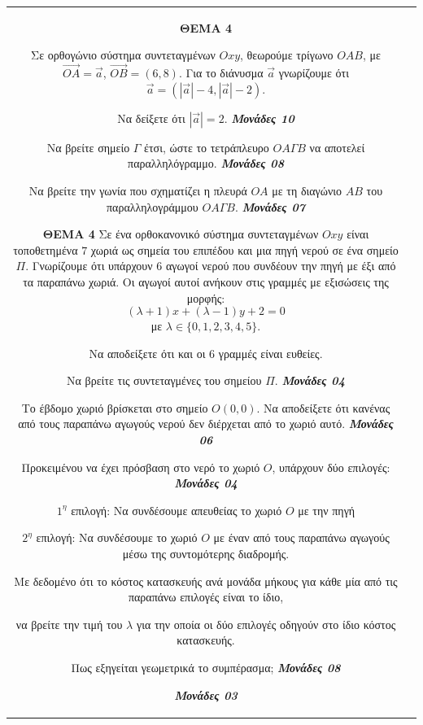 \documentclass[11pt,a4paper,twoside]{book}
\newcommand{\OnPar}[1]{{\notoserif\bfseries\fontsize{18}{22}\selectfont #1}}
\newcommand{\Askhseis}[1]{{\urwgothic\bfseries\fontsize{16}{19}\selectfont #1}}
\newcommand{\monades}[1]{
\hspace*{\fill}
\textbf{\textit{\textcolor{maincolor}{Μονάδες #1}}}}
\begin{document}
\begin{tabular}{cc}
\vspace{4mm}

\begin{center}
    \Askhseis{ΘΕΜΑ 4}
\end{center}

Σε ορθογώνιο σύστημα συντεταγμένων $Oxy$, θεωρούμε τρίγωνο $OAB$, με $\overrightarrow{OA} = \vec{a}$, $\overrightarrow{OB} = (6,8)$. Για το διάνυσμα $\vec{a}$ γνωρίζουμε
ότι $\vec{a} = (\left|\vec{a}\right| - 4, \left|\vec{a}\right| - 2)$.

\begin{alist}    \item Να δείξετε ότι $\left|\vec{a}\right| = 2$. \monades{10}
    \item Να βρείτε σημείο $\Gamma$ έτσι, ώστε το τετράπλευρο $OA\Gamma B$ να αποτελεί παραλληλόγραμμο. \monades{08}
    \item Να βρείτε την γωνία που σχηματίζει η πλευρά $OA$ με τη διαγώνιο $AB$ του παραλληλογράμμου $OA\Gamma B$. \monades{07}\end{alist}

\vspace{4mm}

\OnPar{ΘΕΜΑ 4}
Σε ένα ορθοκανονικό σύστημα συντεταγμένων $Oxy$ είναι τοποθετημένα $7$ χωριά ως σημεία του επιπέδου και μια πηγή νερού σε ένα σημείο $\Pi$. Γνωρίζουμε ότι υπάρχουν $6$ αγωγοί νερού που συνδέουν την πηγή με έξι από τα παραπάνω χωριά. Οι αγωγοί αυτοί ανήκουν στις γραμμές με εξισώσεις της μορφής:
\[ (\lambda + 1)x + (\lambda - 1)y + 2 = 0 \]
με $\lambda \in \{0,1,2,3,4,5\}$.

\begin{alist}    \item Να αποδείξετε ότι και οι $6$ γραμμές είναι ευθείες.
    \item Να βρείτε τις συντεταγμένες του σημείου $\Pi$.  \monades{04}
    \item Το έβδομο χωριό βρίσκεται στο σημείο $O(0,0)$. Να αποδείξετε ότι κανένας από τους παραπάνω αγωγούς νερού δεν διέρχεται από το χωριό αυτό.  \monades{06}
    \item Προκειμένου να έχει πρόσβαση στο νερό το χωριό $O$, υπάρχουν δύο επιλογές:  \monades{04}
    \begin{rlist}
        \item $1^{\eta}$ επιλογή: Να συνδέσουμε απευθείας το χωριό $O$ με την πηγή
        \item $2^{\eta}$ επιλογή: Να συνδέσουμε το χωριό $O$ με έναν από τους παραπάνω αγωγούς μέσω της συντομότερης διαδρομής.
    \end{rlist}
 Με δεδομένο ότι το κόστος κατασκευής ανά μονάδα μήκους για κάθε μία από τις παραπάνω επιλογές είναι το ίδιο,
    \begin{rlist}
        \item να βρείτε την τιμή του $\lambda$ για την οποία οι δύο επιλογές οδηγούν στο ίδιο κόστος κατασκευής.
        \item Πως εξηγείται γεωμετρικά το συμπέρασμα;  \monades{08}
 \monades{03}
    \end{rlist}\end{alist}


\end{tabular}
\end{document}
